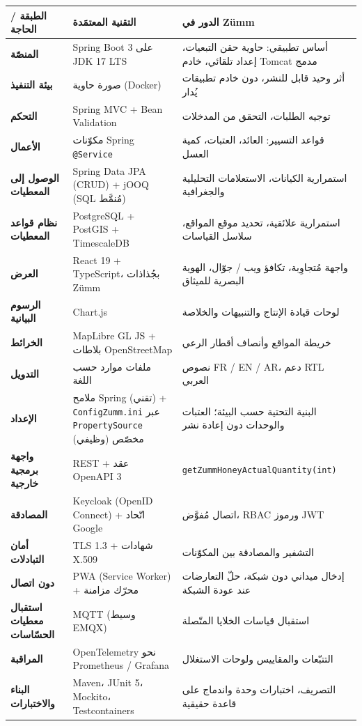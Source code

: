 \begin{xltabular}{\textwidth}{>{\bfseries}p{3.1cm} p{4.9cm} X}
\toprule
\textbf{الطبقة / الحاجة} & \textbf{التقنية المعتمَدة} & \textbf{الدور في Zümm} \\
\midrule
\endhead
المنصّة & Spring Boot 3 على JDK 17 LTS & أساس تطبيقي: حاوية حقن التبعيات، إعداد تلقائي، خادم Tomcat مدمج \\
بيئة التنفيذ & صورة حاوية (Docker) & أثر وحيد قابل للنشر، دون خادم تطبيقات يُدار \\
التحكم & Spring MVC + Bean Validation & توجيه الطلبات، التحقق من المدخلات \\
الأعمال & مكوّنات Spring \texttt{@Service} & قواعد التسيير: العائد، العتبات، كمية العسل \\
الوصول إلى المعطيات & Spring Data JPA (CRUD) + jOOQ (SQL مُنمَّط) & استمرارية الكيانات، الاستعلامات التحليلية والجغرافية \\
نظام قواعد المعطيات & PostgreSQL + PostGIS + TimescaleDB & استمرارية علائقية، تحديد موقع المواقع، سلاسل القياسات \\
العرض & React 19 + TypeScript، بجُذاذات Zümm & واجهة مُتجاوِبة، تكافؤ ويب / جوّال، الهوية البصرية للميثاق \\
الرسوم البيانية & Chart.js & لوحات قيادة الإنتاج والتنبيهات والخلاصة \\
الخرائط & MapLibre GL JS + بلاطات OpenStreetMap & خريطة المواقع وأنصاف أقطار الرعي \\
التدويل & ملفات موارد حسب اللغة & نصوص FR / EN / AR، دعم RTL العربي \\
الإعداد & ملامح Spring (تقني) + \texttt{ConfigZumm.ini} عبر \texttt{PropertySource} مخصّص (وظيفي) & البنية التحتية حسب البيئة؛ العتبات والوحدات دون إعادة نشر \\
واجهة برمجية خارجية & REST + عقد OpenAPI 3 & \texttt{getZummHoneyActualQuantity(int)} \\
المصادقة & Keycloak (OpenID Connect) + اتّحاد Google & اتصال مُفوَّض، RBAC ورموز JWT \\
أمان التبادلات & TLS 1.3 + شهادات X.509 & التشفير والمصادقة بين المكوّنات \\
دون اتصال & PWA (Service Worker) + محرّك مزامنة & إدخال ميداني دون شبكة، حلّ التعارضات عند عودة الشبكة \\
استقبال معطيات الحسّاسات & MQTT (وسيط EMQX) & استقبال قياسات الخلايا المتّصلة \\
المراقبة & OpenTelemetry نحو Prometheus / Grafana & التتبّعات والمقاييس ولوحات الاستغلال \\
البناء والاختبارات & Maven، JUnit 5، Mockito، Testcontainers & التصريف، اختبارات وحدة واندماج على قاعدة حقيقية \\
\bottomrule
\end{xltabular}

